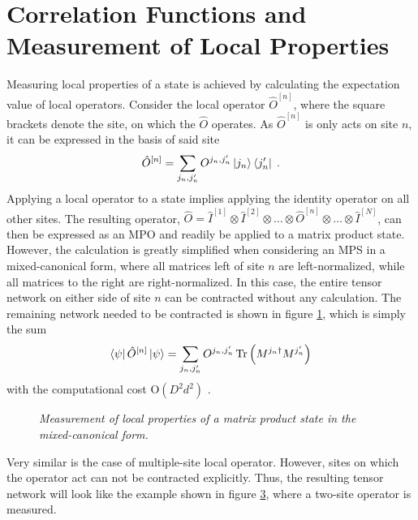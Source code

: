 \section{Correlation Functions and Measurement of Local Properties}
Measuring local properties of a state is achieved by calculating the expectation value of local operators. Consider the local operator $\hat{O}^{[n]}$, where the square brackets denote the site, on which the $\hat{O}$ operates. As $\hat{O}^{[n]}$ is only acts on site $n$, it can be expressed in the basis of said site
\begin{equation}
	\hat{O}^{[n]} = \sum_{j_n , j_n '} O^{j_n , j_n '} \ket{j_n} \bra{j_n '} \; .
	\label{eq:localOperator}
\end{equation}
Applying a local operator to a state implies applying the identity operator on all other sites. The resulting operator, $\hat{O} = \hat{I}^{[1]} \otimes \hat{I}^{[2]} \otimes \ldots \otimes \hat{O}^{[n]} \otimes \ldots \otimes \hat{I}^{[N]}$, can then be expressed as an MPO and readily be applied to a matrix product state. However, the calculation is greatly simplified when considering an MPS in a mixed-canonical form, where all matrices left of site $n$ are left-normalized, while all matrices to the right are right-normalized. In this case, the entire tensor network on either side of site $n$ can be contracted without any calculation. The remaining network needed to be contracted is shown in figure \ref{fig:SingleSiteOperator}, which is simply the sum
\begin{equation}
	\bra{\psi} \hat{O}^{[n]} \ket{\psi} = \sum_{j_n , j_n '} O^{j_n , j_n '} \Tr \left( M^{j_n \dag} M^{j_n '} \right) 
\end{equation}
with the computational cost $\mathrm{O}(D^2 d^2)$ \cite{Schollwock}.
\begin{figure}[h!]
\centering %
\begin{subfigure}[b]{0.35\textwidth}
  	
	\caption{}
	\label{fig:SingleSiteOperator}
\end{subfigure}
\begin{subfigure}[b]{0.35\textwidth}    
  	
	\caption{}
	\label{fig:DoubleSiteOperator}
\end{subfigure}
\caption{\textit{Measurement of local properties of a matrix product state in the mixed-canonical form.}}
\end{figure}
Very similar is the case of multiple-site local operator. However, sites on which the operator act can not be contracted explicitly. Thus, the resulting tensor network will look like the example shown in figure \ref{fig:DoubleSiteOperator}, where a two-site operator is measured.\\

